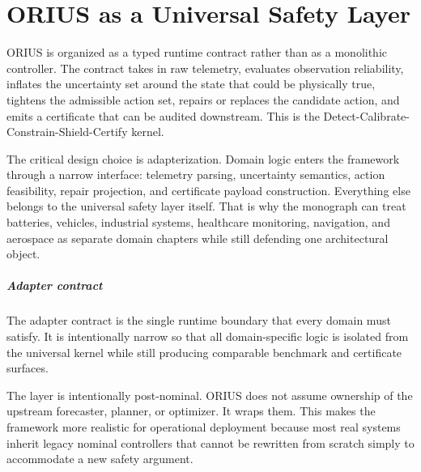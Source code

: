 \chapter{ORIUS as a Universal Safety Layer}
\label{ch:universal-runtime-layer}

ORIUS is organized as a typed runtime contract rather than as a monolithic controller.
The contract takes in raw telemetry, evaluates observation reliability, inflates the
uncertainty set around the state that could be physically true, tightens the admissible
action set, repairs or replaces the candidate action, and emits a certificate that can
be audited downstream.  This is the Detect-Calibrate-Constrain-Shield-Certify kernel.

The critical design choice is adapterization.  Domain logic enters the framework
through a narrow interface: telemetry parsing, uncertainty semantics, action feasibility,
repair projection, and certificate payload construction.  Everything else belongs to the
universal safety layer itself.  That is why the monograph can treat batteries,
vehicles, industrial systems, healthcare monitoring, navigation, and aerospace as
separate domain chapters while still defending one architectural object.

\paragraph{Adapter contract}\label{par:monograph-adapter-contract}
The adapter contract is the single runtime boundary that every domain must satisfy.
It is intentionally narrow so that all domain-specific logic is isolated from the
universal kernel while still producing comparable benchmark and certificate surfaces.

The layer is intentionally post-nominal.  ORIUS does not assume ownership of the
upstream forecaster, planner, or optimizer.  It wraps them.  This makes the framework
more realistic for operational deployment because most real systems inherit legacy
nominal controllers that cannot be rewritten from scratch simply to accommodate a new
safety argument.
